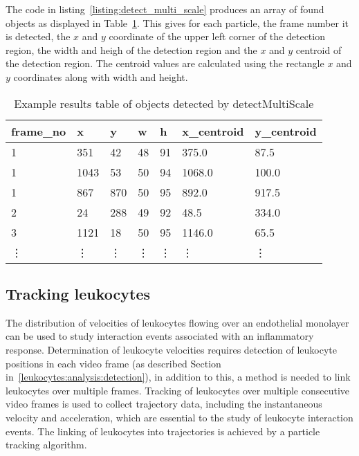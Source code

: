 The code in listing~\ref{listing:detect_multi_scale} produces an array of found objects as displayed in Table~\ref{table:particles_features}. This gives for each particle, the frame number it is detected, the $x$ and $y$ coordinate of the upper left corner of the detection region, the width and heigh of the detection region and the $x$ and $y$ centroid of the detection region. The centroid values are calculated using the rectangle $x$ and $y$ coordinates along with width and height.

\begin{table}[htbp]
\centering
\caption{Example results table of objects detected by detectMultiScale}
\begin{tabular}{lllllll}
\toprule
frame\_no & x      & y      & w      & h      & x\_centroid & y\_centroid \\
\midrule
1         & 351    & 42     & 48     & 91     & 375.0       & 87.5        \\
1         & 1043   & 53     & 50     & 94     & 1068.0      & 100.0       \\
1         & 867    & 870    & 50     & 95     & 892.0       & 917.5       \\
2         & 24     & 288    & 49     & 92     & 48.5        & 334.0       \\
3         & 1121   & 18     & 50     & 95     & 1146.0      & 65.5        \\
\vdots    & \vdots & \vdots & \vdots & \vdots & \vdots      & \vdots      \\
\bottomrule
\end{tabular}
\label{table:particles_features}
\end{table}

\subsection{Tracking leukocytes}
\label{leukocytes:analysis:tracking}
The distribution of velocities of leukocytes flowing over an endothelial monolayer can be used to study interaction events associated with an inflammatory response. Determination of leukocyte velocities requires detection of leukocyte positions in each video frame (as described Section in~\ref{leukocytes:analysis:detection}), in addition to this, a method is needed to link leukocytes over multiple frames. Tracking of leukocytes over multiple consecutive video frames is used to collect trajectory data, including the instantaneous velocity and acceleration, which are essential to the study of leukocyte interaction events. The linking of leukocytes into trajectories is achieved by a particle tracking algorithm.

